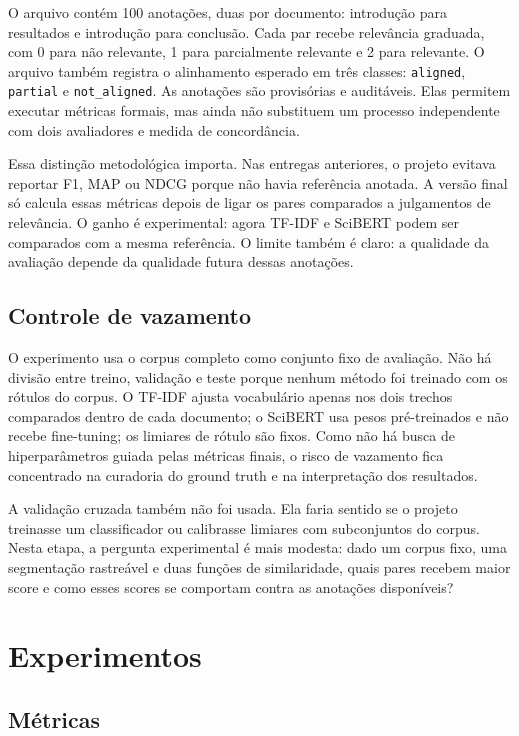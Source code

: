 \documentclass[12pt]{article}
\begin{document}
O arquivo  contém 100 anotações, duas por documento: introdução para resultados e introdução para conclusão. Cada par recebe relevância graduada, com 0 para não relevante, 1 para parcialmente relevante e 2 para relevante. O arquivo também registra o alinhamento esperado em três classes: \texttt{aligned}, \texttt{partial} e \texttt{not\_aligned}. As anotações são provisórias e auditáveis. Elas permitem executar métricas formais, mas ainda não substituem um processo independente com dois avaliadores e medida de concordância.

Essa distinção metodológica importa. Nas entregas anteriores, o projeto evitava reportar F1, MAP ou NDCG porque não havia referência anotada. A versão final só calcula essas métricas depois de ligar os pares comparados a julgamentos de relevância. O ganho é experimental: agora TF-IDF e SciBERT podem ser comparados com a mesma referência. O limite também é claro: a qualidade da avaliação depende da qualidade futura dessas anotações.

\subsection{Controle de vazamento}

O experimento usa o corpus completo como conjunto fixo de avaliação. Não há divisão entre treino, validação e teste porque nenhum método foi treinado com os rótulos do corpus. O TF-IDF ajusta vocabulário apenas nos dois trechos comparados dentro de cada documento; o SciBERT usa pesos pré-treinados e não recebe fine-tuning; os limiares de rótulo são fixos. Como não há busca de hiperparâmetros guiada pelas métricas finais, o risco de vazamento fica concentrado na curadoria do ground truth e na interpretação dos resultados.

A validação cruzada também não foi usada. Ela faria sentido se o projeto treinasse um classificador ou calibrasse limiares com subconjuntos do corpus. Nesta etapa, a pergunta experimental é mais modesta: dado um corpus fixo, uma segmentação rastreável e duas funções de similaridade, quais pares recebem maior score e como esses scores se comportam contra as anotações disponíveis?

\section{Experimentos}

\subsection{Métricas}
\end{document}

